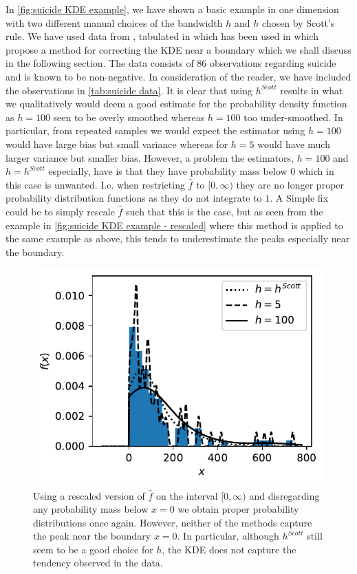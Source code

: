 \documentclass[../Thesis.tex]{subfiles}
\begin{document}
In \autoref{fig:suicide KDE example}, we have shown a basic example in one dimension with two different manual choices of the bandwidth $h$ and $h$ chosen by Scott's rule. We have used data from \cite{Density-Estimation-and-Suicide-Risks-in-Psychiatric-Treatment}, tabulated in \cite{Silverman86} which has been used in \cite{Jones1993SimpleBC} which propose a method for correcting the KDE near a boundary which we shall discuss in the following section. The data consists of $86$ observations regarding suicide and is known to be non-negative. In consideration of the reader, we have included the observations in \autoref{tab:suicide data}. It is clear that using $h^{Scott}$ results in what we qualitatively would deem a good estimate for the probability density function as $h = 100$ seen to be overly smoothed whereas $h = 100$ too under-smoothed. In particular, from repeated samples we would expect the estimator using $h= 100$ would have large bias but small variance whereas for $h = 5$ would have much larger variance but smaller bias. However, a problem the estimators, $h = 100$ and $h = h^{Scott}$ especially, have is that they have probability mass below $0$ which in this case is unwanted. I.e. when restricting $\hat{f}$ to $[0,\infty)$ they are no longer proper probability distribution functions as they do not integrate to $1$. A Simple fix could be to simply rescale $\hat{f}$ such that this is the case, but as seen from the example in \autoref{fig:suicide KDE example - rescaled} where this method is applied to the same example as above, this tends to underestimate the peaks especially near the boundary.

\begin{figure}[h]
    \centering
    \includegraphics[width = .6\linewidth]{figures/MI estimation/suicide data example - rescaled.pdf}
    \caption{Using a rescaled version of $\hat{f}$ on the interval $[0,\infty)$ and disregarding any probability mass below $x=0$ we obtain proper probability distributions once again. However, neither of the methods capture the peak near the boundary $x=0$. In particular, although $h^{Scott}$ still seem to be a good choice for $h$, the KDE does not capture the tendency observed in the data.}
    \label{fig:suicide KDE example - rescaled}
\end{figure}
\end{document}
